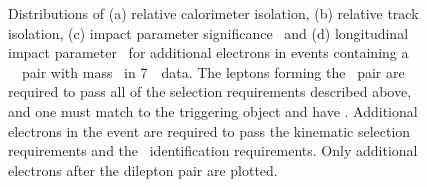 \begin{figure}[h]
\centering
\caption[ Distributions of relative track and calorimeter isolation, \dzerosig\
and \zzero\ for additional electrons in events containing a dilepton pair with
mass \sstooos\ in 7~\tev\ data.]{Distributions of (a) relative calorimeter isolation, (b)
relative track isolation, (c) impact parameter significance \dzerosig\
and (d) longitudinal impact parameter \zzero\ for additional electrons in events
containing a \ossf\ \dilepton\ pair with
mass \sstooos\ in 7~\tev\ data. The leptons forming the \dilepton\ pair are required to pass all of
the selection requirements described above, and one must match to the triggering
object and have \ptgt{25}. Additional electrons in the event are required to pass
the kinematic selection requirements and the \loosePP\ identification
requirements. Only additional electrons after the dilepton pair are plotted.}
\label{fig:objsel-el}
\end{figure}

